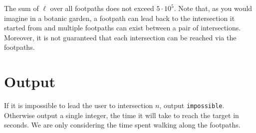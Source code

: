 The sum of $\ell$ over all footpaths does not exceed $5 \cdot 10^5$. Note that, as you would imagine in a botanic garden, a footpath can lead back to the intersection it started from and multiple footpaths can exist between a pair of intersections. Moreover, it is not guaranteed that each intersection can be reached via the footpaths.

\section*{Output}
If it is impossible to lead the user to intersection $n$, output \texttt{impossible}. Otherwise output a single integer, the time it will take to reach the target in seconds. We are only considering the time spent walking along the footpaths.
